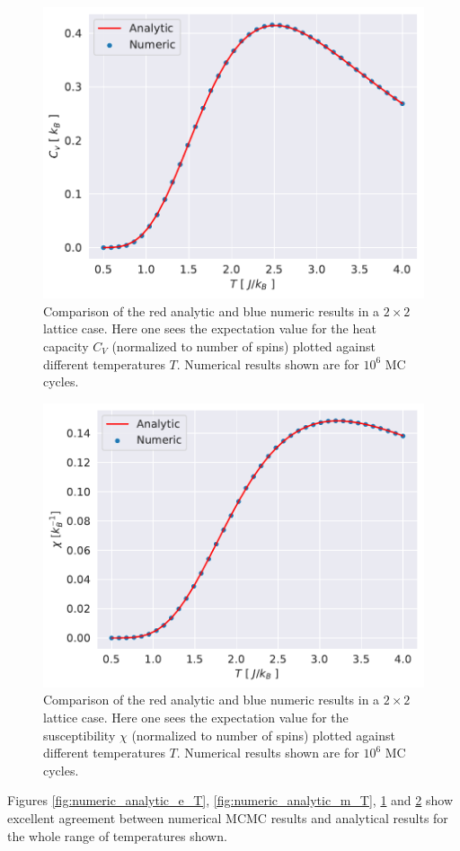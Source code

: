 \documentclass[english,notitlepage,reprint,nofootinbib]{revtex4-1}  %
\begin{document}
\begin{figure}[H]
    \centering
    \includegraphics[width=.5\textwidth]{../figures/numeric_analytic_c_v_T.pdf}
    \caption{Comparison of the red analytic and blue numeric results in a $2\times2$ lattice case. Here one sees the expectation value for the heat capacity $C_V$ (normalized to number of spins) plotted against different temperatures $T$. Numerical results shown are for $10^6$ MC cycles.}
    \label{fig:numeric_analytic_c_v_T}
\end{figure}

\begin{figure}[H]
    \centering
    \includegraphics[width=.5\textwidth]{../figures/numeric_analytic_X_T.pdf}
    \caption{Comparison of the red analytic and blue numeric results in a $2\times2$ lattice case. Here one sees the expectation value for the susceptibility $\chi$ (normalized to number of spins) plotted against different temperatures $T$. Numerical results shown are for $10^6$ MC cycles.}
    \label{fig:numeric_analytic_X_T}
\end{figure}

Figures \ref{fig:numeric_analytic_e_T}, \ref{fig:numeric_analytic_m_T}, \ref{fig:numeric_analytic_c_v_T} and \ref{fig:numeric_analytic_X_T} show excellent agreement between numerical MCMC results and analytical results for the whole range of temperatures shown. 
\end{document}
